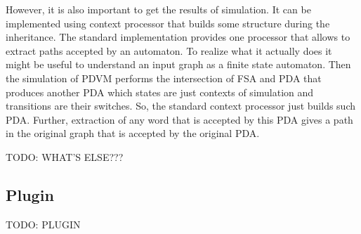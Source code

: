 However, it is also important to get the results of simulation.
It can be implemented using context processor that builds some structure during the inheritance.
The standard implementation provides one processor that allows to extract paths accepted by an automaton.
To realize what it actually does it might be useful to understand an input graph as a finite state automaton.
Then the simulation of PDVM performs the intersection of FSA and PDA that produces another PDA which states are just contexts of simulation and transitions are their switches.
So, the standard context processor just builds such PDA.
Further, extraction of any word that is accepted by this PDA gives a path in the original graph that is accepted by the original PDA.

TODO: WHAT'S ELSE???

\subsection{Plugin}

TODO: PLUGIN
